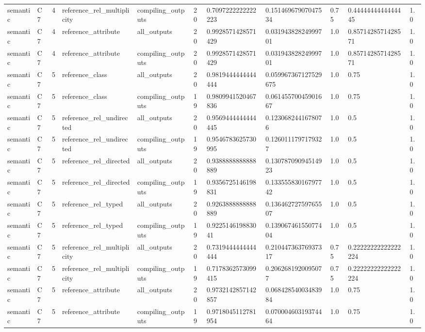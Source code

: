 \begin{tabular}{lllllllllll}
semantic & C7 & 4 & reference\_rel\_multiplicity & compiling\_outputs & 20 & 0.7097222222222223 & 0.15146967907047534 & 0.75 & 0.4444444444444445 & 1.0 \\
semantic & C7 & 4 & reference\_attribute & all\_outputs & 20 & 0.9928571428571429 & 0.03194382824999701 & 1.0 & 0.8571428571428571 & 1.0 \\
semantic & C7 & 4 & reference\_attribute & compiling\_outputs & 20 & 0.9928571428571429 & 0.03194382824999701 & 1.0 & 0.8571428571428571 & 1.0 \\
semantic & C7 & 5 & reference\_class & all\_outputs & 20 & 0.9819444444444444 & 0.059967367127529675 & 1.0 & 0.75 & 1.0 \\
semantic & C7 & 5 & reference\_class & compiling\_outputs & 19 & 0.9809941520467836 & 0.06145570045901667 & 1.0 & 0.75 & 1.0 \\
semantic & C7 & 5 & reference\_rel\_undirected & all\_outputs & 20 & 0.9569444444444445 & 0.1230682441678076 & 1.0 & 0.5 & 1.0 \\
semantic & C7 & 5 & reference\_rel\_undirected & compiling\_outputs & 19 & 0.9546783625730995 & 0.1260111797179327 & 1.0 & 0.5 & 1.0 \\
semantic & C7 & 5 & reference\_rel\_directed & all\_outputs & 20 & 0.9388888888888889 & 0.13078709094514923 & 1.0 & 0.5 & 1.0 \\
semantic & C7 & 5 & reference\_rel\_directed & compiling\_outputs & 19 & 0.9356725146198831 & 0.13355583016797742 & 1.0 & 0.5 & 1.0 \\
semantic & C7 & 5 & reference\_rel\_typed & all\_outputs & 20 & 0.9263888888888889 & 0.13646272759765507 & 1.0 & 0.5 & 1.0 \\
semantic & C7 & 5 & reference\_rel\_typed & compiling\_outputs & 19 & 0.922514619883041 & 0.13906746155077404 & 1.0 & 0.5 & 1.0 \\
semantic & C7 & 5 & reference\_rel\_multiplicity & all\_outputs & 20 & 0.7319444444444444 & 0.21044736376937317 & 0.75 & 0.22222222222222224 & 1.0 \\
semantic & C7 & 5 & reference\_rel\_multiplicity & compiling\_outputs & 19 & 0.7178362573099415 & 0.2062681920095077 & 0.75 & 0.22222222222222224 & 1.0 \\
semantic & C7 & 5 & reference\_attribute & all\_outputs & 20 & 0.9732142857142857 & 0.06842854003483984 & 1.0 & 0.75 & 1.0 \\
semantic & C7 & 5 & reference\_attribute & compiling\_outputs & 19 & 0.9718045112781954 & 0.07000460319374464 & 1.0 & 0.75 & 1.0 \\
\end{tabular}